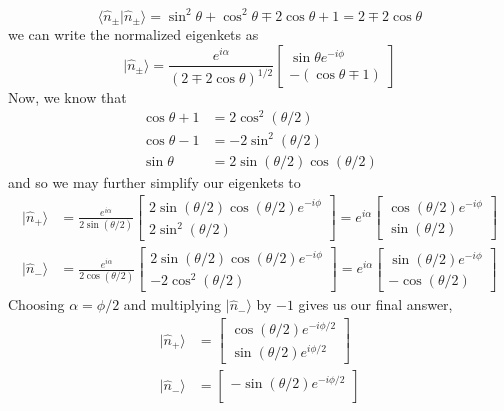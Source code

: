 \documentclass[../principles-of-quantum-mechanics.tex]{subfiles}
\begin{document}
\begin{questions}
\begin{solution}
			$$\langle \hat{n}_\pm|\hat{n}_\pm\rangle = \sin^2\theta + \cos^2\theta \mp 2\cos\theta + 1 = 2 \mp 2\cos\theta$$
			we can write the normalized eigenkets as
			$$|\hat{n}_\pm\rangle = \frac{e^{i\alpha}}{(2 \mp 2\cos\theta)^{1/2}}\begin{bmatrix}
				\sin\theta e^{-i\phi} \\
				-(\cos\theta \mp 1)
			\end{bmatrix}$$
			Now, we know that
			\begin{align*}
				\cos\theta + 1 &= 2\cos^2(\theta/2) \\
				\cos\theta - 1 &= -2\sin^2(\theta/2) \\
				\sin\theta &= 2\sin(\theta/2)\cos(\theta/2)
			\end{align*}
			and so we may further simplify our eigenkets to
			\begin{align*}
				|\hat{n}_+\rangle &= \frac{e^{i\alpha}}{2\sin(\theta/2)}\begin{bmatrix}
					2\sin(\theta/2)\cos(\theta/2)e^{-i\phi} \\
					2\sin^2(\theta/2)
				\end{bmatrix} = e^{i\alpha}\begin{bmatrix}
				\cos(\theta/2)e^{-i\phi} \\
				\sin(\theta/2)
			\end{bmatrix} \\
			|\hat{n}_-\rangle &= \frac{e^{i\alpha}}{2\cos(\theta/2)}\begin{bmatrix}
				2\sin(\theta/2)\cos(\theta/2)e^{-i\phi} \\
				-2\cos^2(\theta/2)
			\end{bmatrix} = e^{i\alpha}\begin{bmatrix}
				\sin(\theta/2)e^{-i\phi} \\
				-\cos(\theta/2)
			\end{bmatrix}
			\end{align*}
			Choosing $\alpha = \phi/2$ and multiplying $|\hat{n}_-\rangle$ by ${-1}$ gives us our final answer,
			\begin{align*}
				|\hat{n}_+\rangle &= \begin{bmatrix}
					\cos(\theta/2)e^{-i\phi/2} \\
					\sin(\theta/2)e^{i\phi/2}
					\end{bmatrix} \\
				|\hat{n}_-\rangle &= \begin{bmatrix}
					-\sin(\theta/2)e^{-i\phi/2} \\

\end{bmatrix}
\end{align*}
\end{solution}
\end{questions}
\end{document}

